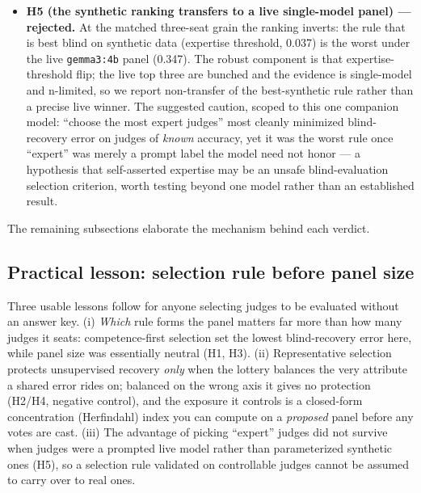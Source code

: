 \documentclass[
]{article}
\begin{document}
\begin{itemize}
  \emph{global-injection} tolerance sweep leaves the
  recovery-vs-correlation slope unresolved (-0.145, 95\% CI {[}-4.335,
  0.911{]} crosses zero), and we now read that as a limitation of that
  instrument --- it couples correlation uniformly to a fixed trio and
  uses a small grid --- rather than as evidence of no effect. The
  composition-coupled, marginal-accuracy-preserving sweep
  (fig.~\ref{fig:blocphase}), with far more observations per point,
  resolves the recovery half in the affirmative: recovery error rises
  with within-bloc coupling for the panels that concentrate the
  confound, and the closed-form Herfindahl account (§Methods) explains
  the ordering. So the recovery half is a result, not an open question,
  under a correctly specified confound.
\item
  \textbf{H5 (the synthetic ranking transfers to a live single-model
  panel) --- rejected.} At the matched three-seat grain the ranking
  inverts: the rule that is best blind on synthetic data (expertise
  threshold, 0.037) is the worst under the live \texttt{gemma3:4b} panel
  (0.347). The robust component is that expertise-threshold flip; the
  live top three are bunched and the evidence is single-model and
  n-limited, so we report non-transfer of the best-synthetic rule rather
  than a precise live winner. The suggested caution, scoped to this one
  companion model: ``choose the most expert judges'' most cleanly
  minimized blind-recovery error on judges of \emph{known} accuracy, yet
  it was the worst rule once ``expert'' was merely a prompt label the
  model need not honor --- a hypothesis that self-asserted expertise may
  be an unsafe blind-evaluation selection criterion, worth testing
  beyond one model rather than an established result.
\end{itemize}

The remaining subsections elaborate the mechanism behind each verdict.

\subsection{Practical lesson: selection rule before panel
size}\label{practical-lesson-selection-rule-before-panel-size}

Three usable lessons follow for anyone selecting judges to be evaluated
without an answer key. (i) \emph{Which} rule forms the panel matters far
more than how many judges it seats: competence-first selection set the
lowest blind-recovery error here, while panel size was essentially
neutral (H1, H3). (ii) Representative selection protects unsupervised
recovery \emph{only} when the lottery balances the very attribute a
shared error rides on; balanced on the wrong axis it gives no protection
(H2/H4, negative control), and the exposure it controls is a closed-form
concentration (Herfindahl) index you can compute on a \emph{proposed}
panel before any votes are cast. (iii) The advantage of picking
``expert'' judges did not survive when judges were a prompted live model
rather than parameterized synthetic ones (H5), so a selection rule
validated on controllable judges cannot be assumed to carry over to real
ones.
\end{document}
